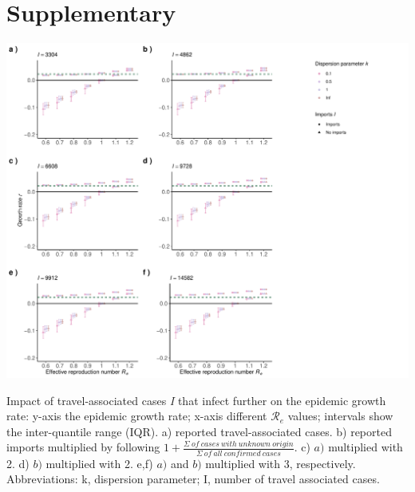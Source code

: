 \documentclass[10pt, a4paper, twoside]{article}
\begin{document}
\section{Supplementary}
\begin{suppfigure}[h]
\centering
\includegraphics[scale=0.5]{growth_r_imports_infect_2021-02-24.pdf}
\caption{Impact of travel-associated cases \emph{I} that infect further on the epidemic growth rate: y-axis the epidemic growth rate; x-axis different $\mathcal{R}_e$ values; intervals show the inter-quantile range (IQR). a) reported travel-associated cases. b) reported imports multiplied by following $1+ \frac{\Sigma ~of ~cases ~with ~unknown ~origin }{\Sigma ~of ~all ~confirmed ~cases}$. c) $a)$ multiplied with 2. d) $b)$ multiplied with 2. e,f) $a)$ and $b)$ multiplied with 3, respectively. Abbreviations: k, dispersion parameter; I, number of travel associated cases.}
\end{suppfigure}
\clearpage
\end{document}
